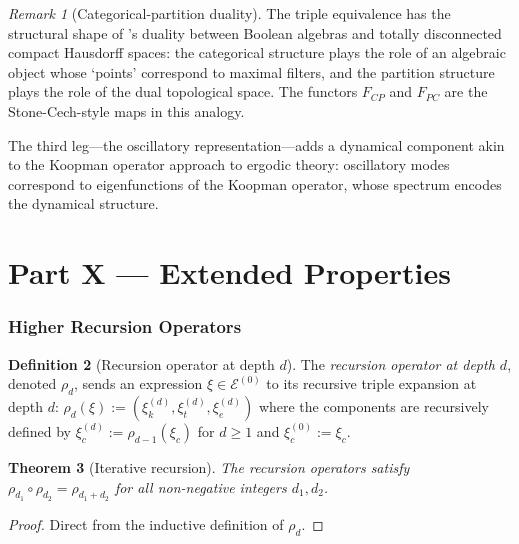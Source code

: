 \documentclass[11pt,a4paper]{article}
\theoremstyle{thmstyle}
\newtheorem{theorem}{Theorem}[section]
\theoremstyle{thmstyle}
\theoremstyle{definition}
\newtheorem{definition}[theorem]{Definition}
\theoremstyle{remark}
\newtheorem{remark}[theorem]{Remark}
\newcommand{\Expr}{\mathcal{E}}
\begin{document}
\begin{remark}[Categorical-partition duality]
\label{rem:cat-part-duality}
The triple equivalence has the structural shape of
\citet{stone1936}'s duality between Boolean
algebras and totally disconnected compact
Hausdorff spaces: the categorical structure plays
the role of an algebraic object whose `points'
correspond to maximal filters, and the partition
structure plays the role of the dual topological
space.  The functors $F_{CP}$ and $F_{PC}$ are
the Stone-Cech-style maps in this analogy.

The third leg---the oscillatory representation---adds
a dynamical component akin to the Koopman
operator approach \citep{koopman1931} to ergodic
theory: oscillatory modes correspond to
eigenfunctions of the Koopman operator, whose
spectrum encodes the dynamical structure.
\end{remark}

\clearpage

\part*{Part X --- Extended Properties}

\section{Higher Recursion Operators}
\label{sec:higher-recursion}

\begin{definition}[Recursion operator at depth $d$]
\label{def:rec-op-d}
The \emph{recursion operator at depth $d$},
denoted $\rho_{d}$, sends an expression
$\xi \in \Expr^{(0)}$ to its recursive triple
expansion at depth $d$:
$\rho_{d}(\xi) := (\xi_{k}^{(d)},
\xi_{t}^{(d)}, \xi_{e}^{(d)})$ where the
components are recursively defined by
$\xi_{c}^{(d)} := \rho_{d-1}(\xi_{c})$ for $d \geq
1$ and $\xi_{c}^{(0)} := \xi_{c}$.
\end{definition}

\begin{theorem}[Iterative recursion]
\label{thm:iter-rec}
The recursion operators satisfy
$\rho_{d_{1}} \circ \rho_{d_{2}} = \rho_{d_{1} + d_{2}}$
for all non-negative integers $d_{1}, d_{2}$.
\end{theorem}

\begin{proof}
Direct from the inductive definition of
$\rho_{d}$.
\end{proof}
\end{document}
